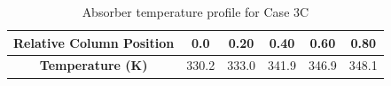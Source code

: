 \begin{table}[htbp]
    \centering
    \caption{Absorber temperature profile for Case 3C}
    \label{tab:3C-temp-profile}
    \renewcommand{\arraystretch}{1.2}
    \begin{tabular}{|c|c|c|c|c|c|}
        \hline
        \textbf{Relative Column Position} & 0.0 & 0.20 & 0.40 & 0.60 & 0.80 \\
        \hline
        \textbf{Temperature (K)} & 330.2 & 333.0 & 341.9 & 346.9 & 348.1 \\
        \hline
    \end{tabular}
\end{table}
